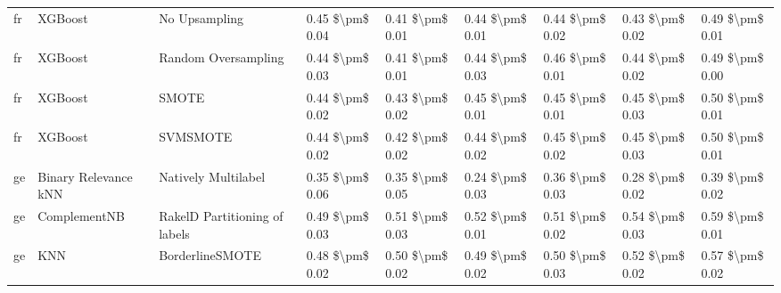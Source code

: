 \begin{tabular}{lllllllll}
      fr &                         XGBoost &                 No Upsampling & 0.45 \$\textbackslash pm\$ 0.04 &           0.41 \$\textbackslash pm\$ 0.01 &       0.44 \$\textbackslash pm\$ 0.01 &        0.44 \$\textbackslash pm\$ 0.02 &                         0.43 \$\textbackslash pm\$ 0.02 &     0.49 \$\textbackslash pm\$ 0.01 \\
      fr &                         XGBoost &           Random Oversampling & 0.44 \$\textbackslash pm\$ 0.03 &           0.41 \$\textbackslash pm\$ 0.01 &       0.44 \$\textbackslash pm\$ 0.03 &        0.46 \$\textbackslash pm\$ 0.01 &                         0.44 \$\textbackslash pm\$ 0.02 &     0.49 \$\textbackslash pm\$ 0.00 \\
      fr &                         XGBoost &                         SMOTE & 0.44 \$\textbackslash pm\$ 0.02 &           0.43 \$\textbackslash pm\$ 0.02 &       0.45 \$\textbackslash pm\$ 0.01 &        0.45 \$\textbackslash pm\$ 0.01 &                         0.45 \$\textbackslash pm\$ 0.03 &     0.50 \$\textbackslash pm\$ 0.01 \\
      fr &                         XGBoost &                      SVMSMOTE & 0.44 \$\textbackslash pm\$ 0.02 &           0.42 \$\textbackslash pm\$ 0.02 &       0.44 \$\textbackslash pm\$ 0.02 &        0.45 \$\textbackslash pm\$ 0.02 &                         0.45 \$\textbackslash pm\$ 0.03 &     0.50 \$\textbackslash pm\$ 0.01 \\
      ge &            Binary Relevance kNN &           Natively Multilabel & 0.35 \$\textbackslash pm\$ 0.06 &           0.35 \$\textbackslash pm\$ 0.05 &       0.24 \$\textbackslash pm\$ 0.03 &        0.36 \$\textbackslash pm\$ 0.03 &                         0.28 \$\textbackslash pm\$ 0.02 &     0.39 \$\textbackslash pm\$ 0.02 \\
      ge &                    ComplementNB & RakelD Partitioning of labels & 0.49 \$\textbackslash pm\$ 0.03 &           0.51 \$\textbackslash pm\$ 0.03 &       0.52 \$\textbackslash pm\$ 0.01 &        0.51 \$\textbackslash pm\$ 0.02 &                         0.54 \$\textbackslash pm\$ 0.03 &     0.59 \$\textbackslash pm\$ 0.01 \\
      ge &                             KNN &               BorderlineSMOTE & 0.48 \$\textbackslash pm\$ 0.02 &           0.50 \$\textbackslash pm\$ 0.02 &       0.49 \$\textbackslash pm\$ 0.02 &        0.50 \$\textbackslash pm\$ 0.03 &                         0.52 \$\textbackslash pm\$ 0.02 &     0.57 \$\textbackslash pm\$ 0.02 \\

\end{tabular}
